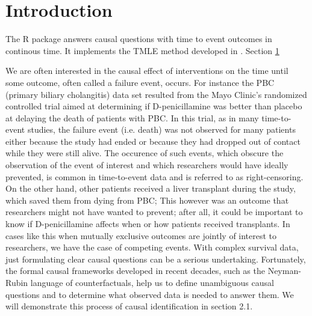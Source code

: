 \documentclass{report}
\author{Thomas Alexander Gerds}
\date{\today}
\title{}
\newcommand{\1}{\ensuremath{\mathbf{1}}}
\begin{document}

\tableofcontents

\section{Introduction}
\label{intro}
The R package  answers causal questions with time to
event outcomes in continous time. It implements the TMLE method
developed in \cite{rytgaard2021one}. Section \ref{intro}

We are often interested in the causal effect of interventions on the time until some outcome, often called a failure event, occurs. For instance the PBC (primary biliary cholangitis) data set resulted from the Mayo Clinic's randomized controlled trial aimed at determining if D-penicillamine was better than placebo at delaying the death of patients with PBC. In this trial, as in many time-to-event studies, the failure event (i.e. death) was not observed for many patients either because the study had ended or because they had dropped out of contact while they were still alive. The occurence of such events, which obscure the observation of the event of interest and which researchers would have ideally prevented, is common in time-to-event data and is referred to as right-censoring. On the other hand, other patients received a liver transplant during the study, which saved them from dying from PBC; This however was an outcome that researchers might not have wanted to prevent; after all, it could be important to know if D-penicillamine affects when or how patients received transplants. In cases like this when mutually exclusive outcomes are jointly of interest to researchers, we have the case of competing events. With complex survival data, just formulating clear causal questions can be a serious undertaking. Fortunately, the formal causal frameworks developed in recent decades, such as the Neyman-Rubin language of counterfactuals, help us to define unambiguous causal questions and to determine what observed data is needed to answer them. We will demonstrate this process of causal identification in section 2.1.
\end{document}
